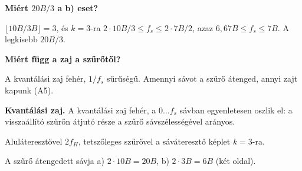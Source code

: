 \begin{elmelet}
\textbf{Miért $20B/3$ a b) eset?}\par $\lfloor10B/3B\rfloor=3$, és $k=3$-ra $2\cdot10B/3\le f_s\le2\cdot7B/2$, azaz $6{,}67B\le f_s\le7B$. A legkisebb $20B/3$.

\textbf{Miért függ a zaj a szűrőtől?}\par A kvantálási zaj fehér, $1/f_s$ sűrűségű. Amennyi sávot a szűrő átenged, annyi zajt kapunk (A5).
\end{elmelet}
\begin{elmelet}
\textbf{Kvantálási zaj.} A kvantálási zaj fehér, a $0\ldots f_s$ sávban egyenletesen oszlik el: a visszaállító szűrőn átjutó része a szűrő sávszélességével arányos.
\begin{center}\end{center}

\end{elmelet}

Aluláteresztővel $2f_H$, tetszőleges szűrővel a sáváteresztő képlet $k=3$-ra.

\begin{center}\end{center}

\begin{center}\end{center}

A szűrő átengedett sávja a) $2\cdot10B=20B$, b) $2\cdot3B=6B$ (két oldal).

\begin{center}\end{center}

\begin{center}\end{center}

